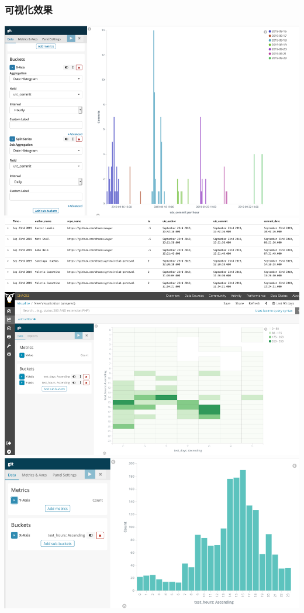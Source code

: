\hypertarget{ux53efux89c6ux5316ux6548ux679c}{%
\subsubsection{可视化效果}\label{ux53efux89c6ux5316ux6548ux679c}}

\includegraphics{images/activity-dates-and-times_1.png}
\includegraphics{images/activity-dates-and-times_2.png}
\includegraphics{images/activity-dates-and-times_3.png}
\includegraphics{images/activity-dates-and-times_4.png}

